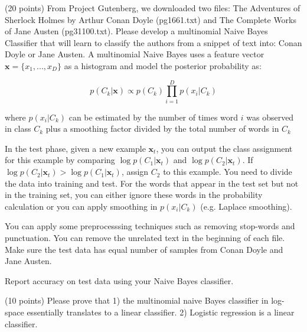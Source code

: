 \documentclass{exam}
\begin{document}
\begin{questions}
 (20 points) From Project Gutenberg, we downloaded two files: The Adventures of Sherlock Holmes by Arthur Conan Doyle (pg1661.txt) and The Complete Works of Jane Austen (pg31100.txt). Please develop a multinomial Naive Bayes Classifier that will learn to classify the authors from a snippet of text into: Conan Doyle or Jane Austen. A multinomial Naive Bayes uses a feature vector $\mathbf{x}=\{x_1,...,x_D\}$ as a histogram and model the posterior probability as:

\begin{equation}
    p(C_k|\mathbf{x}) \propto p(C_k)\prod_{i=1}^D p(x_i|C_k)
\end{equation}

where $p(x_i|C_k)$ can be estimated by the number of times word $i$ was observed in class $C_k$ plus a smoothing factor divided by the total number of words in $C_k$

In the test phase, given a new example $\mathbf{x}_t$, you can output the class assignment for this example by comparing $\log p(C_1|\mathbf{x}_t)$ and $\log p(C_2|\mathbf{x}_t)$. If $\log p(C_2|\mathbf{x}_t) > \log p(C_1|\mathbf{x}_t)$, assign $C_2$ to this example.
 You need to divide the data into training and test.  For the words that appear in the test set but not in the training set, you can either ignore these words in the probability calculation or you can apply smoothing in $p(x_i|C_k)$ (e.g. Laplace smoothing).
 
You can apply some preprocesssing techniques such as removing stop-words and punctuation. You can remove the unrelated text in the beginning of each file. Make sure the test data has equal number of samples from Conan Doyle and Jane Austen. 

Report accuracy on test data using your Naive Bayes classifier. 

\vspace{5em}

 (10 points) Please prove that 1) the multinomial naive Bayes classifier in log-space essentially translates to a linear classifier. 2) Logistic regression is a linear classifier.
\vspace{5em}




\end{questions}
\end{document}
